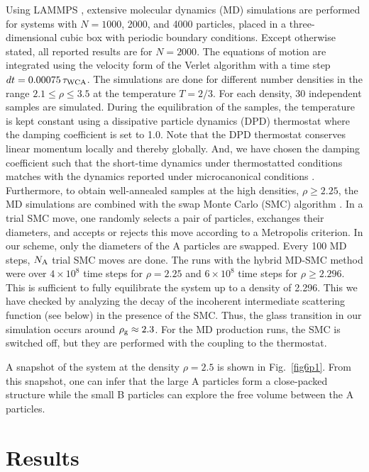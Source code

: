 Using LAMMPS \cite{plimpton1995}, extensive molecular dynamics (MD) simulations are performed for systems with $N = 1000$, 2000, and 4000 particles, placed in a three-dimensional cubic box with periodic boundary conditions. Except otherwise stated, all reported results are for $N=2000$. The equations of motion are integrated using the velocity form of the Verlet algorithm \cite{allen2017} with a time step $dt = 0.00075 \, \tau_{\rm WCA}$.  The simulations are done for different number densities in the range $2.1 \le \rho \le 3.5$ at the temperature $T = 2/3$. For each density, 30 independent samples are simulated.  During the equilibration of the samples, the temperature is kept constant using a dissipative particle dynamics (DPD) thermostat \cite{soddemann2003} where the damping coefficient is set to 1.0. {Note that the DPD thermostat conserves linear momentum locally and thereby globally. And, we have chosen the damping coefficient such that the short-time dynamics under thermostatted conditions matches with the dynamics reported under microcanonical conditions \cite{horbach2009}. Furthermore, to obtain well-annealed samples at} the high densities, $\rho \ge 2.25$, the MD simulations are combined with the swap Monte Carlo (SMC) algorithm \cite{grigera2001, berthier2019}.  In a trial SMC move, one randomly selects a pair of particles, exchanges their diameters, and accepts or rejects this move according to a Metropolis criterion. In our scheme, only the diameters of the A particles are swapped. Every 100 MD steps, $N_{\rm A}$ trial SMC moves are done. The runs with the hybrid MD-SMC method were over $4 \times 10^8$ time steps for $\rho = 2.25$ and $6 \times 10^8$ time steps for $\rho \ge 2.296$. This is sufficient to fully equilibrate the system up to a density of 2.296. This we have checked by analyzing the decay of the incoherent intermediate scattering function (see below) in the presence of the SMC. Thus, the glass transition in our simulation occurs around $\rho_{\rm g} \approx 2.3$. For the MD production runs, the SMC is switched off, but they are performed with the coupling to the thermostat.

A snapshot of the system at the density $\rho = 2.5$ is shown in Fig.~\ref{fig6p1}. From this snapshot, one can infer that the large A particles form a close-packed structure while the small B particles can explore the free volume between the A particles.



%
\section{Results}
\label{sec3}



